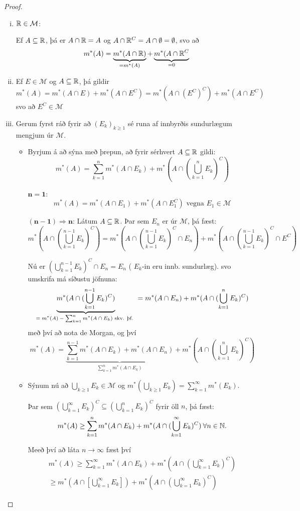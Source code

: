 \documentclass[12pt]{book}
\newcommand{\cM}{\mathcal{M}}
\begin{document}
\begin{proof}
  \begin{enumerate}[(i)]
  \item  $\R \in \cM $:

    Ef $A \subseteq \mathbb{R}$, þá er $A \cap \mathbb{R} = A$ og $A \cap \mathbb{R}^C = A \cap \emptyset = \emptyset$,
svo að 
\[ m^*(A) = \underbrace{m^*(A \cap \mathbb{R})}_{= m^*(A)} +  \underbrace{m^*(A\cap \mathbb{R}^C}_{= 0}\]
\item Ef $E \in \cM$ og $A \subseteq \mathbb{R}$, þá gildir
\[ m^*(A) = m^*(A \cap E) + m^*(A \cap E^C) = m^*(A \cap ( E^C)^C) + m^*(A \cap E^C) \]
svo að $E^C \in \cM$
\item Gerum fyrst ráð fyrir að $(E_k)_{k \geq 1}$ sé runa af innbyrðis sundurlægum mengjum úr $\cM$.

  \begin{itemize}
  \item Byrjum á að sýna með þrepun, að fyrir sérhvert $A \subseteq \mathbb{R}$ gildi:
    \[ m^*(A) = \sum_{k=1}^n m^*(A \cap E_k) + m^*(A \cap (\bigcup_{k=1}^n E_k)^C) \]

    $\mathbf{n = 1}$: \[m^*(A) = m^*(A \cap E_1) + m^*(A \cap E_1^C) \text{ vegna } E_1 \in \cM \]


    $\mathbf{(n-1) \Rightarrow n}$: Látum $A \subseteq \mathbb{R}$. Þar sem $E_n$ er úr $\cM$, þá
    fæst:
    \[ m^*(A \cap (\bigcup_{k=1}^{n-1} E_k)^C) =  m^*(A \cap (\bigcup_{k=1}^{n-1} E_k)^C \cap E_n) +  m^*(A \cap (\bigcup_{k=1}^{n-1} E_k)^C \cap E^C) \]

    Nú er $(\bigcup_{k=1}^{n-1} E_k)^C \cap E_n = E_n$ ( $E_k$-in eru innb. sundurlæg).
    svo umskrifa má síðustu jöfnuna:
      \[ \underbrace{m^*(A \cap (\bigcup_{k=1}^{n-1} E_k)^C)}_{\text{$= m^*(A) - \sum_{k=1}^n m^*(A \cap E_k)$ skv. þf. }} = m^*(A \cap E_n) + m^*(A \cap (\bigcup_{k=1}^{n} E_k)^C ) \]
      með því að nota de Morgan,
      og því
      \[ m^*(A) = \underbrace{\sum_{k=1}^{n-1} m^*(A \cap E_k) + m^*(A \cap E_n)}_{\sum_{k=1}^{n} m^*(A\cap E_k)} + m^*(A \cap (\bigcup_{k=1}^{n} E_k)^C) \]
    \item Sýnum nú að $\bigcup_{k \geq 1} E_k \in \cM$ og $m^*(\bigcup_{k \geq 1} E_k) = \sum_{k=1}^{\infty} m^*(E_k)$.

      Þar sem $(\bigcup_{k=1}^{\infty} E_k)^C \subseteq (\bigcup_{k=1}^n E_k)^C$ fyrir öll $n$, þá fæst:
      \[ m^*(A) \geq \sum_{k=1}^n m^*(A \cap E_k) + m^*(A \cap (\bigcup_{k=1}^{\infty} E_k)^C) \: \forall n \in \mathbb{N}. \]
      
      Meeð því að láta $n \to \infty$ fæst því
      \begin{gather*}
        m^*(A) \geq \sum_{k=1}^{\infty} m^*(A \cap E_k) + m^*(A \cap (\bigcup_{k=1}^{\infty} E_k)^C)\\
        \geq m^*(A \cap [\bigcup_{k=1}^{\infty} E_k]) + m^*(A \cap (\bigcup_{k=1}^{\infty} E_k)^C)
      \end{gather*}


\end{itemize}
\end{enumerate}
\end{proof}
\end{document}
